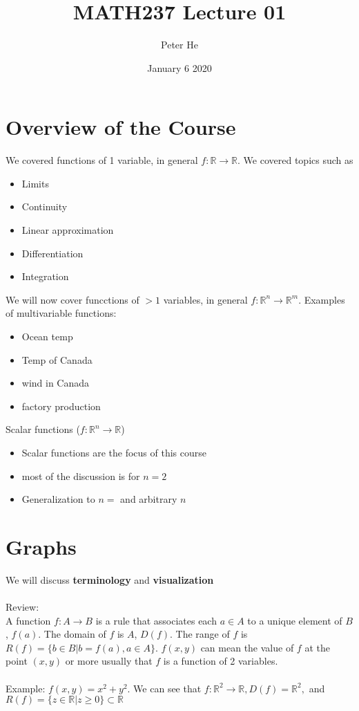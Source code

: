 \documentclass[12pt]{article}
\title{MATH237 Lecture 01}
\author{Peter He}
\date{January 6 2020}
\newcommand{\R}{\mathbb{R}}
\begin{document}
\maketitle

\section{Overview of the Course}
We covered functions of 1 variable, in general $f:\R\to\R$. We covered topics such as
\begin{itemize}
    \item Limits
    \item Continuity
    \item Linear approximation
    \item Differentiation
    \item Integration
\end{itemize}
We will now cover funcctions of $>1$ variables, in general $f:\R^n\to\R^m$. Examples of multivariable functions:
\begin{itemize}
    \item Ocean temp
    \item Temp of Canada
    \item wind in Canada
    \item factory production
\end{itemize}
Scalar functions ($f:\R^n\to\R$)
\begin{itemize}
    \item Scalar functions are the focus of this course
    \item most of the discussion is for $n=2$
    \item Generalization to $n=$ and arbitrary $n$
\end{itemize}

\section{Graphs}
We will discuss \textbf{terminology} and \textbf{visualization}\\\\
Review:\\
A function $f:A\to B$ is a rule that associates each $a\in A$ to a unique element of $B$, $f(a)$. The domain of $f$ is $A$, $D(f)$. The range of $f$ is $R(f)=\{b\in B|b=f(a), a\in A\}$. $f(x,y)$ can mean the value of $f$ at the point $(x,y)$ or more usually that $f$ is a function of 2 variables.\\\\
Example: $f(x,y)=x^2+y^2$. We can see that $f:\R^2\to \R, D(f)=\R^2,$ and $R(f)=\{z\in \R|z\geq 0\}\subset\R$
\end{document}
